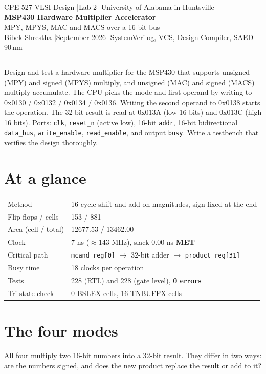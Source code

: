 \documentclass[11pt,a4paper]{article}
\newcommand{\met}{\textcolor{okgreen}{\textbf{MET}}}
\newcommand{\header}[3]{%
  \begin{center}
  {\small\color{cm} CPE 527 VLSI Design \quad|\quad Lab 2 \quad|\quad University of Alabama in Huntsville}\\[8pt]
  {\LARGE\bfseries\color{accent} #1}\\[4pt]
  {\large #2}\\[8pt]
  {\small Bibek Shrestha \quad|\quad September 2026 \quad|\quad #3}
  \end{center}\vspace{2pt}\hrule\vspace{6pt}}
\begin{document}
\header{MSP430 Hardware Multiplier Accelerator}{MPY, MPYS, MAC and MACS over a 16-bit bus}{SystemVerilog, VCS, Design Compiler, SAED 90\,nm}

\begin{task}
Design and test a hardware multiplier for the MSP430 that supports unsigned (MPY) and signed (MPYS) multiply,
and unsigned (MAC) and signed (MACS) multiply-accumulate. The CPU picks the mode and first operand by writing to
0x0130 / 0x0132 / 0x0134 / 0x0136. Writing the second operand to 0x0138 starts the operation. The 32-bit result
is read at 0x013A (low 16 bits) and 0x013C (high 16 bits). Ports: \texttt{clk}, \texttt{reset\_n} (active low),
16-bit \texttt{addr}, 16-bit bidirectional \texttt{data\_bus}, \texttt{write\_enable}, \texttt{read\_enable},
and output \texttt{busy}. Write a testbench that verifies the design thoroughly.
\end{task}

\section*{At a glance}
\begin{table}[H]\centering\small
\begin{tabular}{ll}
\toprule
Method & 16-cycle shift-and-add on magnitudes, sign fixed at the end \\
Flip-flops / cells & 153 / 881 \\
Area (cell / total) & 12677.53 / 13462.00 \\
Clock & 7 ns ($\approx$143 MHz), slack 0.00 ns \met \\
Critical path & \texttt{mcand\_reg[0]} $\rightarrow$ 32-bit adder $\rightarrow$ \texttt{product\_reg[31]} \\
Busy time & 18 clocks per operation \\
Tests & 228 (RTL) and 228 (gate level), \textbf{0 errors} \\
Tri-state check & 0 BSLEX cells, 16 TNBUFFX cells \\
\bottomrule
\end{tabular}
\end{table}

\section{The four modes}
All four multiply two 16-bit numbers into a 32-bit result. They differ in two ways: are the numbers signed,
and does the new product replace the result or add to it?
\end{document}
